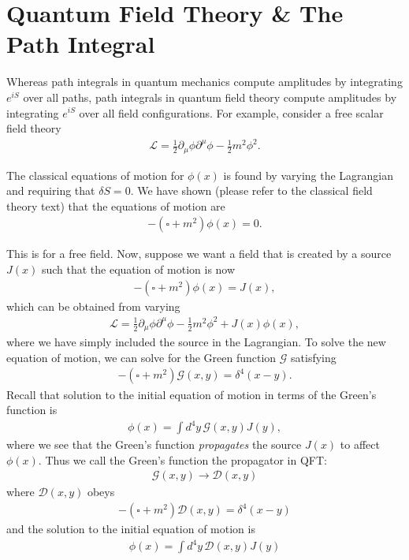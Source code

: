 \documentclass{book}
\theoremstyle{definition}
\newcommand{\p}{\partial}
\newcommand{\lag}{\mathcal{L}}
\newcommand{\G}{\mathcal{G}}
\newcommand{\f}[2]{\frac{#1}{#2}}
\newcommand{\D}{\mathcal{D}}
\begin{document}
\newpage

\section{Quantum Field Theory \& The Path Integral}



Whereas path integrals in quantum mechanics compute amplitudes by integrating $e^{iS}$ over all paths, path integrals in quantum field theory compute amplitudes by integrating $e^{iS}$ over all field configurations. For example, consider a free scalar field theory
\begin{align}
\lag = \f{1}{2}\p_\mu \phi \p^\mu \phi - \f{1}{2}m^2\phi^2.
\end{align}

The classical equations of motion for $\phi(x)$ is found by varying the Lagrangian and requiring that $\delta S = 0$. We have shown (please refer to the classical field theory text) that the equations of motion are
\begin{align}
-(\square + m^2)\phi(x) = 0.
\end{align}

This is for a free field. Now, suppose we want a field that is created by a source $J(x)$ such that the equation of motion is now
\begin{align}
-(\square + m^2)\phi(x) = J(x),
\end{align}
which can be obtained from varying 
\begin{align}
\lag = \f{1}{2}\p_\mu \phi \p^\mu \phi - \f{1}{2}m^2\phi^2 + J(x)\phi(x),
\end{align}
where we have simply included the source in the Lagrangian. To solve the new equation of motion, we can solve for the Green function $\G$ satisfying
\begin{align}
-(\square + m^2)\G(x,y) = \delta^4(x - y).
\end{align}
Recall that solution to the initial equation of motion in terms of the Green's function is
\begin{align}
\phi(x) = \int d^4y\, \G(x,y)J(y),
\end{align}
where we see that the Green's function \textit{propagates} the source $J(x)$ to affect $\phi(x)$. Thus we call the Green's function the propagator in QFT:
\begin{align}
\G(x,y) \to \D(x,y)
\end{align}
where $\D(x,y)$ obeys
\begin{align}
\boxed{-(\square + m^2)\D(x,y) = \delta^4(x-y)}
\end{align}
and the solution to the initial equation of motion is
\begin{align}
\boxed{\phi(x) = \int d^4y\, \D(x,y)J(y)}
\end{align}
\end{document}
